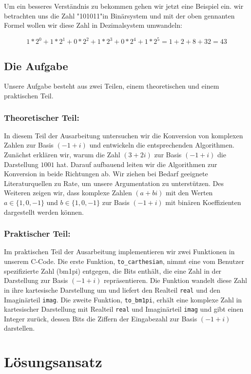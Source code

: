 \documentclass[course=erap]{aspdoc}
\begin{document}
Um ein besseres Verständnis zu bekommen gehen wir jetzt eine Beispiel ein. wir betrachten uns die Zahl "101011"\space in Binärsystem und mit der oben gennanten Formel wollen wir diese Zahl in Dezimalsystem umwandeln: 

\[1* 2^0 + 1*2^1 + 0* 2^2 + 1* 2^3 + 0* 2^4 + 1* 2^5 = 1+2+8+32 = 43 \]
\newpage
\subsection{Die Aufgabe}

Unsere Aufgabe besteht aus zwei Teilen, einem theoretischen und einem praktischen Teil.

\subsubsection{Theoretischer Teil:}
In diesem Teil der Ausarbeitung untersuchen wir die Konversion von komplexen Zahlen zur Basis $(-1 + i)$ und entwickeln die entsprechenden Algorithmen. Zunächst erklären wir, warum die Zahl $(3 + 2i)$ zur Basis $(-1 + i)$ die Darstellung $1001$ hat. Darauf aufbauend leiten wir die Algorithmen zur Konversion in beide Richtungen ab. Wir ziehen bei Bedarf geeignete Literaturquellen zu Rate, um unsere Argumentation zu unterstützen. Des Weiteren zeigen wir, dass komplexe Zahlen $(a + bi)$ mit den Werten $a \in \{1, 0, -1\}$ und $b \in \{1, 0, -1\}$ zur Basis $(-1 + i)$ mit binären Koeffizienten dargestellt werden können.

\subsubsection{Praktischer Teil:}
Im praktischen Teil der Ausarbeitung implementieren wir zwei Funktionen in unserem C-Code. Die erste Funktion, \texttt{to\_carthesian}, nimmt eine vom Benutzer spezifizierte Zahl (bm1pi) entgegen, die Bits enthält, die eine Zahl in der Darstellung zur Basis $(-1 + i)$ repräsentieren. Die Funktion wandelt diese Zahl in ihre kartesische Darstellung um und liefert den Realteil \texttt{real} und den Imaginärteil \texttt{imag}. Die zweite Funktion, \texttt{to\_bm1pi}, erhält eine komplexe Zahl in kartesischer Darstellung mit Realteil \texttt{real} und Imaginärteil \texttt{imag} und gibt einen Integer zurück, dessen Bits die Ziffern der Eingabezahl zur Basis $(-1 + i)$ darstellen.

\section{Lösungsansatz}
\end{document}
